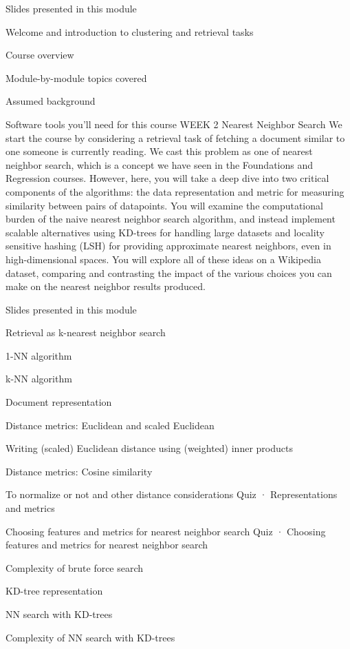\item Slides presented in this module
\item Welcome and introduction to clustering and retrieval tasks
\item Course overview
\item Module-by-module topics covered
\item Assumed background
\item Software tools you'll need for this course
WEEK 2
Nearest Neighbor Search
We start the course by considering a retrieval task of fetching a document similar to one someone is currently reading. We cast this problem as one of nearest neighbor search, which is a concept we have seen in the Foundations and Regression courses. However, here, you will take a deep dive into two critical components of the algorithms: the data representation and metric for measuring similarity between pairs of datapoints. You will examine the computational burden of the naive nearest neighbor search algorithm, and instead implement scalable alternatives using KD-trees for handling large datasets and locality sensitive hashing (LSH) for providing approximate nearest neighbors, even in high-dimensional spaces. You will explore all of these ideas on a Wikipedia dataset, comparing and contrasting the impact of the various choices you can make on the nearest neighbor results produced.
\item Slides presented in this module
\item Retrieval as k-nearest neighbor search
\item 1-NN algorithm
\item k-NN algorithm
\item Document representation
\item Distance metrics: Euclidean and scaled Euclidean
\item Writing (scaled) Euclidean distance using (weighted) inner products
\item Distance metrics: Cosine similarity
\item To normalize or not and other distance considerations
Quiz · Representations and metrics
\item Choosing features and metrics for nearest neighbor search
Quiz · Choosing features and metrics for nearest neighbor search
\item Complexity of brute force search
\item KD-tree representation
\item NN search with KD-trees
\item Complexity of NN search with KD-trees
